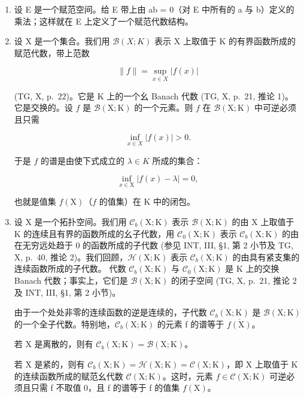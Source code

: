 \begin{enumerate}
\def\labelenumi{\arabic{enumi})}
\item
  设 E 是一个赋范空间。给 E 带上由 ab = 0（对 E 中所有的 a 与 b）定义的乘法；这样就在 E 上定义了一个赋范代数结构。
\item
  设 X 是一个集合。我们用 \(\mathcal{B}(X;K)\) 表示 X 上取值于 K 的有界函数所成的赋范代数，带上范数

\[
\| f \| = \sup _ {x \in X} | f (x) |
\]

(TG, X, p.~22)。它是 K 上的一个幺 Banach 代数 (TG, X, p.~21, 推论 1)。它是交换的。设 \(f\) 是 \(\mathcal{B}(\mathrm{X};\mathrm{K})\) 的一个元素。则 \(f\) 在 \(\mathcal{B}(\mathrm{X};\mathrm{K})\) 中可逆必须且只需

\[
\inf _ {x \in X} | f (x) | > 0.
\]

于是 \(f\) 的谱是由使下式成立的 \(\lambda\in K\) 所成的集合：

\[
\inf _ {x \in \mathrm{X}} | f (x) - \lambda | = 0,
\]

也就是值集 \(f(\mathrm{X})\)（\(f\) 的值集）在 K 中的闭包。

\item
  设 X 是一个拓扑空间。我们用 \(\mathcal{C}_{b}(\mathrm{X};\mathrm{K})\) 表示 \(\mathcal{B}(\mathrm{X};\mathrm{K})\) 的由 X 上取值于 K 的连续且有界的函数所成的幺子代数，用 \(\mathcal{C}_{0}(\mathrm{X};\mathrm{K})\) 表示 \(\mathcal{C}_{b}(\mathrm{X};\mathrm{K})\) 的由在无穷远处趋于 0 的函数所成的子代数 (参见 INT, III, §1, 第 2 小节及 TG, X, p.~40, 推论 2)。我们回顾，\(\mathcal{H}(\mathrm{X};\mathrm{K})\) 表示 \(\mathcal{C}_{b}(\mathrm{X};\mathrm{K})\) 的由具有紧支集的连续函数所成的子代数。
代数 \(\mathcal{C}_{b}(\mathrm{X};\mathrm{K})\) 与 \(\mathcal{C}_{0}(\mathrm{X};\mathrm{K})\) 是 K 上的交换 Banach 代数；事实上，它们是 \(\mathcal{B}(\mathrm{X};\mathrm{K})\) 的闭子空间 (TG, X, p.~21, 推论 2 及 INT, III, §1, 第 2 小节)。

由于一个处处非零的连续函数的逆是连续的，子代数 \(\mathcal{C}_{b}(\mathrm{X};\mathrm{K})\) 是 \(\mathcal{B}(\mathrm{X};\mathrm{K})\) 的一个全子代数。特别地，\(\mathcal{C}_{b}(\mathrm{X};\mathrm{K})\) 的元素 f 的谱等于 \(\overline{f(\mathrm{X})}\)。

若 X 是离散的，则有 \(\mathcal{C}_b(\mathrm{X};\mathrm{K}) = \mathcal{B}(\mathrm{X};\mathrm{K})\)。

若 X 是紧的，则有 \(\mathcal{C}_{b}(\mathrm{X};\mathrm{K}) = \mathcal{H}(\mathrm{X};\mathrm{K}) = \mathcal{C}(\mathrm{X};\mathrm{K})\)，即 X 上取值于 K 的连续函数所成的赋范幺代数 \(\mathcal{C}(\mathrm{X};\mathrm{K})\)。这时，元素 \(f \in \mathcal{C}(\mathrm{X};\mathrm{K})\) 可逆必须且只需 f 不取值 0，且 f 的谱等于 f 的值集 \(f(\mathrm{X})\)。


\end{enumerate}
